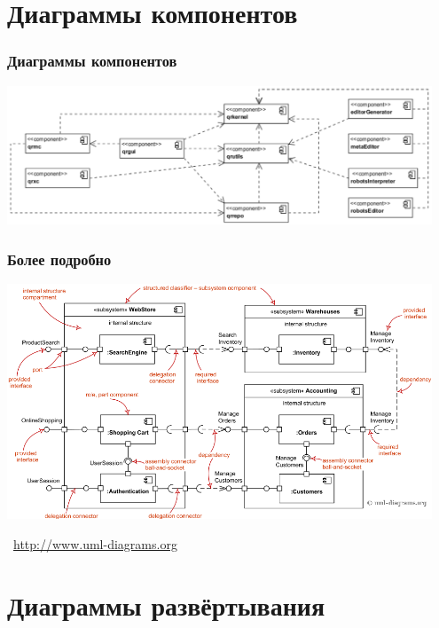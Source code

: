 \documentclass[xetex,mathserif,serif]{beamer}
\newcommand{\attribution}[1] {
    \vspace{-5mm}\begin{flushright}\begin{scriptsize}\textcolor{gray}{\textcopyright\, #1}\end{scriptsize}\end{flushright}
}
\begin{document}
    \section{Диаграммы компонентов}
    
    \begin{frame}
        \frametitle{Диаграммы компонентов}
        \begin{center}
            \includegraphics[width=0.95\textwidth]{componentDiagrams.png}
        \end{center}
    \end{frame}

    \begin{frame}
        \frametitle{Более подробно}
        \begin{center}
            \includegraphics[width=0.95\textwidth]{componentDiagramsOverview.png}
            \attribution{\url{http://www.uml-diagrams.org}}
        \end{center}
    \end{frame}

    \section{Диаграммы развёртывания}
    
\end{document}
